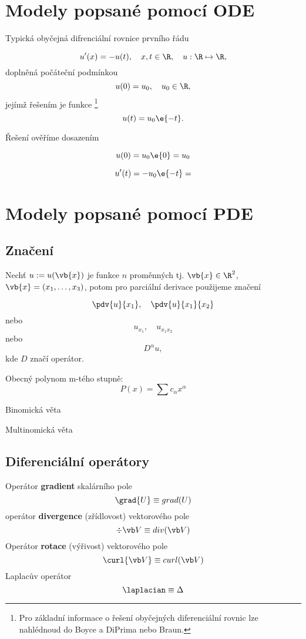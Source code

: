 
\chapter{Modely popsané pomocí ODE} 

Typická obyčejná difrenciální rovnice prvního řádu

\begin{equation}
    u'(x) = -u(t), \quad x, t \in \R, \quad u: \R \mapsto \R,
\end{equation}
 doplněná počáteční podmínkou
 \begin{equation}
    u(0) = u_0, \quad u_0 \in \R,
 \end{equation}
jejímž řešením je funkce \footnote{Pro základní informace o řešení  obyčejných diferenciální rovnic lze nahlédnoud do Boyce a DiPrima nebo Braun.}
$$    
u(t) = u_0 \e{-t}.
$$

\noindent Řešení ověříme dosazením 

$$
u(0) = u_0 \e{0} = u_0
$$

$$
u'(t) = -u_0 \e{-t} = 
$$


\chapter{Modely popsané pomocí PDE}

\section{Značení}

Nechť $u := u(\vb{x}) $ je funkce $n$ proměnných tj. $\vb{x} \in \R^2$, $\vb{x} = (x_1,\ldots,x_3)$, potom pro parciální derivace použijeme značení 

$$
    \pdv{u}{x_1}, \quad \pdv{u}{x_1}{x_2}
$$
nebo 
$$
    u_{x_1}, \quad u_{x_1 x_2}
$$
nebo 
$$
    D^{\alpha}u,
$$
kde $D$ značí operátor.

\noindent Obecný polynom m-tého stupně:
$$
P(x) = \sum c_{\alpha} x^{\alpha}
$$

\noindent Binomická věta

\noindent Multinomická věta

\section{Diferenciální operátory}

Operátor \textbf{gradient} skalárního pole
$$
\grad{U} \equiv grad(U)
$$
operátor \textbf{divergence} (zřídlovost) vektorového pole
$$
\div{\vb V} \equiv div( \vb V)
$$
Operátor \textbf{rotace} (výřivost) vektorového pole
$$
\curl{\vb V} \equiv curl(\vb V)
$$
Laplacův operátor
$$
    \laplacian \equiv \Delta
$$

